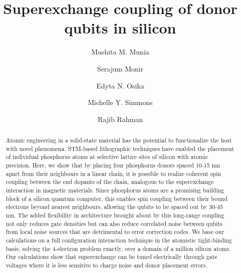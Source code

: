 \documentclass[%
showkeys,
 amsmath,amssymb,
 aps,
prb,
]{revtex4-2}
\begin{document}
\title{Superexchange coupling of donor qubits in silicon}%

\author{Mushita M. Munia}
\author{Serajum Monir}%
\author{Edyta N. Osika}
\author{Michelle Y. Simmons}
\author{Rajib Rahman}

%

\begin{abstract}
Atomic engineering in a solid-state material has the potential to functionalize the host with novel phenomena. STM-based lithographic techniques have enabled the placement of individual phosphorus atoms at selective lattice sites of silicon with atomic precision. Here, we show that by placing four phosphorus donors spaced 10-15 nm apart from their neighbours in a linear chain, it is possible to realize coherent spin coupling between the end dopants of the chain, analogous to the superexchange interaction in magnetic materials. Since phosphorus atoms are a promising building block of a silicon quantum computer, this enables spin coupling between their bound electrons beyond nearest neighbours, allowing the qubits to be spaced out by 30-45 nm. The added flexibility in architecture brought about by this long-range coupling not only reduces gate densities but can also reduce correlated noise between qubits from local noise sources that are detrimental to error correction codes. We base our calculations on a full configuration interaction technique in the atomistic tight-binding basis, solving the 4-electron problem exactly, over a domain of a million silicon atoms. Our calculations show that superexchange can be tuned electrically through gate voltages where it is less sensitive to charge noise and donor placement errors. 
\end{abstract}

\maketitle
\end{document}
